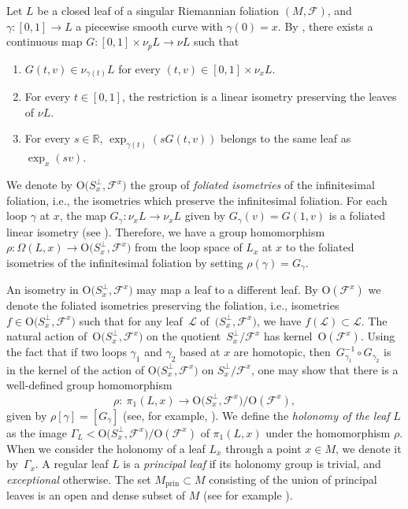 \documentclass[10pt,a4paper]{amsart}
\numberwithin{equation}{section}
\theoremstyle{definition}
\newcommand{\Sp}{S} %
\newcommand{\prin}{\mathrm{prin}}
\newcommand{\fol}{\mathcal{F}}
\begin{document}
Let $L$ be a closed leaf of a singular Riemannian foliation $(M, \mathcal{F})$,
and $\gamma\colon [0,1] \to L$ a piecewise smooth curve with $\gamma(0) = x $. By \cite{Mendes2020}, there exists a continuous map
$G\colon [0,1] \times \nu_p L \to \nu L$
such that
\begin{enumerate}\itemsep=0pt
 \item[(a)] \( G(t, v) \in \nu_{\gamma(t)} L \) for every \( (t, v) \in [0,1] \times \nu_x L \).
 \item[(b)] For every \( t \in [0,1] \), the restriction
 is a linear isometry preserving the leaves of \( \nu L \).
 \item[(c)] For every \( s \in \mathbb{R} \), \( \exp_{\gamma(t)} (sG(t, v)) \) belongs to the same leaf as \( \exp_x (sv) \).
\end{enumerate}


We denote by $\mathrm{O}\bigl(S^\perp_x,\fol^x\bigr)$ the group of \emph{foliated isometries} of the infinitesimal foliation, i.e., the isometries which preserve the infinitesimal foliation.
For each loop $\gamma$ at $x$, the map $G_\gamma\colon {\nu_x L\to \nu_x L}$ given by $G_\gamma(v) = G(1,v)$ is a foliated linear isometry (see \cite[Corollary~15]{MendesRadeschi2019}).
Therefore, we have a group homomorphism $\rho\colon\Omega(L,x)\to \mathrm{O}\bigl(S^\perp_x,\fol^x\bigr)$ from the loop space of $L_x$ at $x$ to the foliated isometries of the infinitesimal foliation by setting $\rho(\gamma) = G_\gamma$.

An isometry in $\mathrm{O}\bigl(S^\perp_x,\fol^x\bigr)$ may map a leaf to a different leaf. By $\mathrm{O}(\fol^{x})$ we denote the foliated isometries preserving the foliation, i.e., isometries $f\in \mathrm{O}\bigl(S^\perp_x,\fol^x\bigr)$ such that for any leaf~$\mathcal{L}$ of~$\bigl(S^\perp_x,\fol^x\bigr)$, we have $f(\mathcal{L})\subset \mathcal{L}$. The natural action of~$\mathrm{O}\bigl(S^\perp_{x},\fol^x\bigr)$ on the quotient~$\Sp^\perp_x/\fol^x$ has kernel~$\mathrm{O}(\fol^x)$.
Using the fact that if two loops $\gamma_1$ and $\gamma_2$ based at $x$ are homotopic, then~$G_{\gamma_1}^{-1}\circ G_{\gamma_2}$ is in the kernel of the action of $\mathrm{O}\bigl(\Sp^\perp_x,\fol^x\bigr)$ on $\Sp^\perp_x/\fol^x$, one may show that there is a well-defined group homomorphism
\[
	\rho\colon\ \pi_1(L,x)\to \mathrm{O}\bigl(\Sp^\perp_x,\fol^x\bigr)/\mathrm{O}(\fol^x),
\]
given by $\rho[\gamma] = [G_\gamma]$ (see, for example, \cite[Lemma 2.4 and Proposition 2.5]{Corro}). We define the \emph{holonomy of the leaf} $L$ as the image $\Gamma_L< \mathrm{O}\bigl(\Sp^\perp_x,\fol^x\bigr)/\mathrm{O}(\fol^{x})$ of $\pi_1(L,x)$ under the homomorphism $\rho$. When we consider the holonomy of a leaf $L_x$ through a point $x\in M$, we denote it by~$\Gamma_x$. A regular leaf $L$ is a \emph{principal leaf} if its holonomy group is trivial, and \emph{exceptional} otherwise. The set $M_\prin\subset M$ consisting of the union of principal leaves is an open and dense subset of $M$ (see for example \cite[Proposition 2.8]{Corro}).
\end{document}
